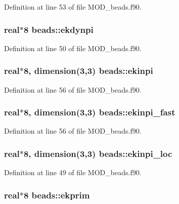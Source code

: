 Definition at line 53 of file M\-O\-D\-\_\-beads.\-f90.

\hypertarget{classbeads_a798e7f2de2d5bedb88e9111689df62e5}{
\subsubsection[{ekdynpi}]{\setlength{\rightskip}{0pt plus 5cm}real$\ast$8 beads\-::ekdynpi}}\label{classbeads_a798e7f2de2d5bedb88e9111689df62e5}


Definition at line 50 of file M\-O\-D\-\_\-beads.\-f90.

\hypertarget{classbeads_a4ef4d946c3f5e1797f46087f8bb6a1b0}{
\subsubsection[{ekinpi}]{\setlength{\rightskip}{0pt plus 5cm}real$\ast$8, dimension(3,3) beads\-::ekinpi}}\label{classbeads_a4ef4d946c3f5e1797f46087f8bb6a1b0}


Definition at line 56 of file M\-O\-D\-\_\-beads.\-f90.

\hypertarget{classbeads_ae29240de23b637b74b7a3ebb4beed1ef}{
\subsubsection[{ekinpi\-\_\-fast}]{\setlength{\rightskip}{0pt plus 5cm}real$\ast$8, dimension(3,3) beads\-::ekinpi\-\_\-fast}}\label{classbeads_ae29240de23b637b74b7a3ebb4beed1ef}


Definition at line 56 of file M\-O\-D\-\_\-beads.\-f90.

\hypertarget{classbeads_ab3b44f3e5218d7874219829843f98a88}{
\subsubsection[{ekinpi\-\_\-loc}]{\setlength{\rightskip}{0pt plus 5cm}real$\ast$8, dimension(3,3) beads\-::ekinpi\-\_\-loc}}\label{classbeads_ab3b44f3e5218d7874219829843f98a88}


Definition at line 49 of file M\-O\-D\-\_\-beads.\-f90.

\hypertarget{classbeads_ae8d29aeba531bd7ef1c9f36bd8974c6d}{
\subsubsection[{ekprim}]{\setlength{\rightskip}{0pt plus 5cm}real$\ast$8 beads\-::ekprim}}\label{classbeads_ae8d29aeba531bd7ef1c9f36bd8974c6d}


